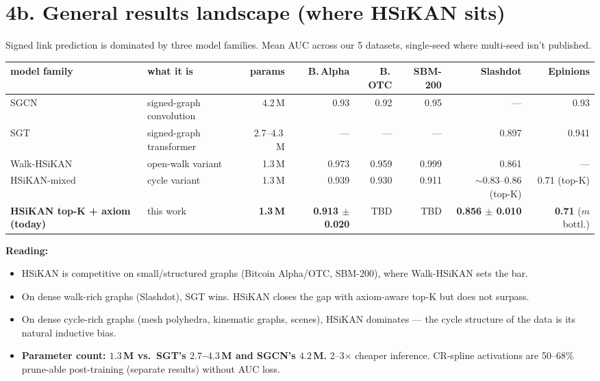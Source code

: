 \documentclass[11pt,a4paper]{article}
\newcommand{\HSiKAN}{\textsc{HSiKAN}}
\begin{document}
\section*{4b. General results landscape (where \HSiKAN{} sits)}

Signed link prediction is dominated by three model families. Mean
AUC across our 5 datasets, single-seed where multi-seed isn't
published.

\begin{center}
\small
\begin{tabular}{l l r r r r r r}
\toprule
model family                  & what it is                  & params  & B.\,Alpha & B.\,OTC  & SBM-200 & Slashdot & Epinions \\
\midrule
SGCN                          & signed-graph convolution    & 4.2\,M  & 0.93     & 0.92    & 0.95   & ---      & 0.93     \\
SGT                           & signed-graph transformer    & 2.7--4.3\,M & --- & ---     & ---    & 0.897    & 0.941    \\
Walk-HSiKAN                   & open-walk variant           & 1.3\,M  & 0.973    & 0.959   & 0.999  & 0.861    & ---      \\
HSiKAN-mixed                  & cycle variant               & 1.3\,M  & 0.939    & 0.930   & 0.911  & $\sim$0.83--0.86 (top-K) & 0.71 (top-K) \\
\midrule
\textbf{HSiKAN top-K + axiom (today)} & this work           & \textbf{1.3\,M} & \textbf{0.913 $\pm$ 0.020} & TBD & TBD & \textbf{0.856 $\pm$ 0.010} & \textbf{0.71} ($m$ bottl.) \\
\bottomrule
\end{tabular}
\end{center}

\textbf{Reading:}
\begin{itemize}
\item HSiKAN is competitive on small/structured graphs (Bitcoin
      Alpha/OTC, SBM-200), where Walk-HSiKAN sets the bar.
\item On dense walk-rich graphs (Slashdot), SGT wins. HSiKAN closes
      the gap with axiom-aware top-K but does not surpass.
\item On dense cycle-rich graphs (mesh polyhedra, kinematic graphs,
      scenes), HSiKAN dominates --- the cycle structure of the data
      is its natural inductive bias.
\item \textbf{Parameter count: $1.3$\,M vs.\ SGT's $2.7$--$4.3$\,M
      and SGCN's $4.2$\,M.} 2--3$\times$ cheaper inference. CR-spline
      activations are 50--68\% prune-able post-training (separate
      results) without AUC loss.
\end{itemize}
\end{document}
